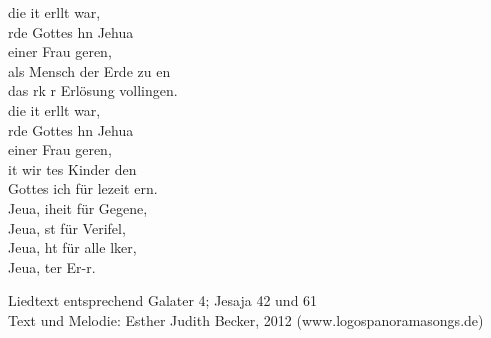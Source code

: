 
 die it erllt war,\\
rde Gottes hn Jehua\\
 einer Frau geren,\\
 als Mensch  der Erde zu en\\
 das rk r Erlösung  vollingen.\\

 die it erllt war,\\
rde Gottes hn Jehua\\
 einer Frau geren,\\
it wir tes Kinder den\\
 Gottes ich für lezeit ern.\\

Jeua, iheit für Gegene,\\
Jeua, st für Verifel,\\
Jeua, ht für alle lker,\\
Jeua, ter  Er-r.\\

\begin{footnotesize}Liedtext entsprechend Galater 4; Jesaja 42 und 61\\
Text und Melodie: Esther Judith Becker, 2012 (www.logospanoramasongs.de)
\end{footnotesize}